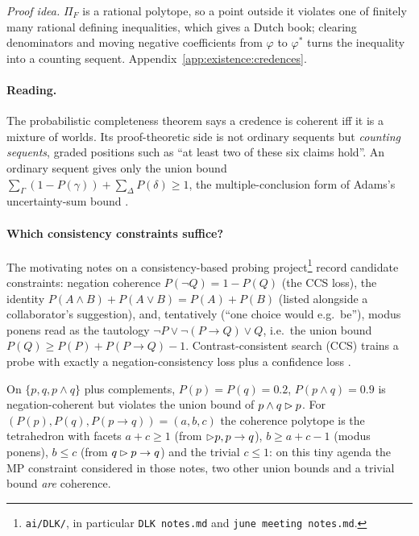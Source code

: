 \emph{Proof idea.} $\Pi_F$ is a rational polytope, so a point outside it violates one of finitely many rational defining inequalities, which gives a Dutch book; clearing denominators and moving negative coefficients from $\varphi$ to $\varphi^*$ turns the inequality into a counting sequent. Appendix~\ref{app:existence:credences}.

\paragraph{Reading.} The probabilistic completeness theorem says a credence is coherent iff it is a mixture of worlds. Its proof-theoretic side is not ordinary sequents but \emph{counting sequents}, graded positions such as ``at least two of these six claims hold''. An ordinary sequent gives only the union bound $\sum_\Gamma(1-P(\gamma))+\sum_\Delta P(\delta)\ge1$, the multiple-conclusion form of Adams's uncertainty-sum bound \citep{adams1966probability}.

\paragraph{Which consistency constraints suffice?} The motivating notes on a consistency-based probing project\footnote{\texttt{ai/DLK/}, in particular \texttt{DLK notes.md} and \texttt{june meeting notes.md}.} record candidate constraints: negation coherence $P(\neg Q)=1-P(Q)$ (the CCS loss), the identity $P(A\wedge B)+P(A\vee B)=P(A)+P(B)$ (listed alongside a collaborator's suggestion), and, tentatively (``one choice would e.g.\ be''), modus ponens read as the tautology $\neg P\vee\neg(P\to Q)\vee Q$, i.e.\ the union bound $P(Q)\ge P(P)+P(P\to Q)-1$. Contrast-consistent search (CCS) trains a probe with exactly a negation-consistency loss plus a confidence loss \citep{burns2023discovering}.

\begin{example}\label{ex:existence:mp}
On $\{p,q,p\wedge q\}$ plus complements, $P(p)=P(q)=0.2$, $P(p\wedge q)=0.9$ is negation-coherent but violates the union bound of $p\wedge q\rhd p$. For $(P(p),P(q),P(p\to q))=(a,b,c)$ the coherence polytope is the tetrahedron with facets $a+c\ge1$ (from $\rhd p,p\to q$), $b\ge a+c-1$ (modus ponens), $b\le c$ (from $q\rhd p\to q$) and the trivial $c\le1$: on this tiny agenda the MP constraint considered in those notes, two other union bounds and a trivial bound \emph{are} coherence.
\end{example}

